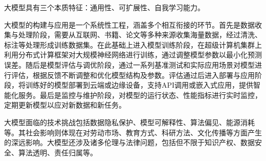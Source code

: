大模型具有三个本质特征：通用性、可扩展性、自我学习能力。

大模型的构建与应用是一个系统性工程，涵盖多个相互衔接的环节。首先是数据收集与处理阶段，需要从互联网、书籍、论文等多种来源收集海量数据，经过清洗、标注等处理形成训练数据集。在此基础上进入模型训练阶段，在超级计算机集群上利用分布式计算框架对大规模神经网络进行训练，通过调整模型参数以最小化预测误差。随后是模型评估与调优阶段，通过一系列基准测试和实际应用场景对模型进行评估，根据反馈不断调整和优化模型结构及参数。评估通过后进入部署与应用阶段，将训练好的模型部署到云端或边缘设备，支持API调用或嵌入式应用，提供智能化服务。最后是监控与维护阶段，对模型的运行状态、性能指标进行实时监控，定期更新模型以应对新数据和新任务。

大模型面临的技术挑战包括数据隐私保护、模型可解释性、算法偏见、能源消耗等。其社会影响则体现在对劳动市场、教育方式、科研方法、文化传播等方面产生的深远影响。大模型还涉及诸多伦理与法律问题，包括但不限于知识产权、数据安全、算法透明、责任归属等。

